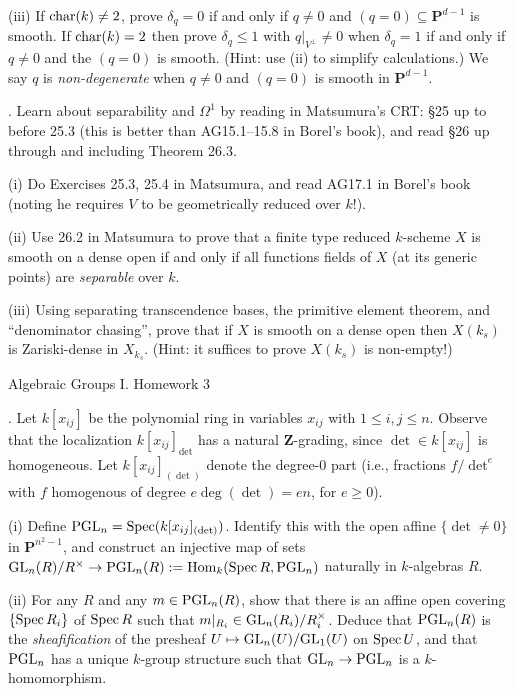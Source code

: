 \documentclass[10pt]{amsart}
\def\Spec{\mathop{\rm Spec}}
\def\Hom{\mathop{\rm Hom}\nolimits}
\begin{document}
(iii) If ${\rm{char}}(k) \ne 2$, prove $\delta_q = 0$  if and only if  $q \ne 0$ and 
$(q = 0) \subseteq {\mathbf{P}}^{d-1}$ is smooth.  
If ${\rm{char}}(k) = 2$ then prove $\delta_q \le 1$ with $q|_{V^{\perp}} \ne 0$
when $\delta_q = 1$ if and only if $q \ne 0$ and 
the $(q=0)$ is smooth.  (Hint: use (ii) to simplify calculations.) 
We say $q$ is {\em non-degenerate} when $q \ne 0$ and $(q = 0)$ is smooth in 
${\mathbf{P}}^{d-1}$. 


\medskip{}.  Learn about separability and $\Omega^1$ by reading in Matsumura's CRT:
\S25 up to before 25.3 (this is better than AG15.1--15.8 in Borel's book), and read 
 \S26 up through and including Theorem 26.3. 
 
 (i) Do Exercises 25.3, 25.4 in Matsumura, and read AG17.1 in Borel's book (noting he
 requires $V$ to be geometrically reduced over $k$!).  
 
 (ii) Use 26.2 in Matsumura to prove that 
 a finite type reduced $k$-scheme $X$ is smooth on
 a dense open if and only if all functions fields of $X$ (at its generic points)
 are {\em separable} over $k$.
 
 (iii) Using separating transcendence bases, the primitive element theorem,
  and ``denominator chasing'',
 prove that if $X$ is smooth on a dense open then $X(k_s)$ is Zariski-dense in
 $X_{k_s}$.  (Hint: it suffices to prove $X(k_s)$ is non-empty!)

\newpage

\centerline{\sc Algebraic Groups I. Homework 3}

.  Let $k[x_{ij}]$ be the polynomial ring in 
variables $x_{ij}$ with $1 \le i, j \le n$.
Observe that the localization $k[x_{ij}]_{\det}$ has a natural $\mathbf{Z}$-grading, since
$\det \in k[x_{ij}]$ is homogeneous.  Let $k[x_{ij}]_{(\det)}$ denote the degree-0 part
(i.e., fractions $f/\det^e$ with $f$ homogenous of degree $e\deg(\det) = e n$, for $e \ge 0$).

(i) Define ${\rm{PGL}}_n = \Spec(k[x_{ij}]_{(\det)})$.
Identify this with the open affine $\{\det \ne 0\}$ in $\mathbf{P}^{n^2-1}$, and 
construct an injective map of sets 
${\rm{GL}}_n(R)/R^{\times} \rightarrow
{\rm{PGL}}_n(R) := \Hom_k(\Spec R, {\rm{PGL}}_n)$
naturally in $k$-algebras $R$.

(ii) For any $R$ and any $m \in {\rm{PGL}}_n(R)$, show that there is an affine open covering
$\{\Spec R_i\}$ of $\Spec R$ such that $m|_{R_i} \in {\rm{GL}}_n(R_i)/R_i^{\times}$.
Deduce that ${\rm{PGL}}_n(R)$ is the {\em sheafification} of the presheaf
$U \mapsto {\rm{GL}}_n(U)/{\rm{GL}}_1(U)$ on $\Spec U$, and that
${\rm{PGL}}_n$ has a unique $k$-group structure such that
${\rm{GL}}_n \rightarrow {\rm{PGL}}_n$ is a $k$-homomorphism. 
\end{document}

